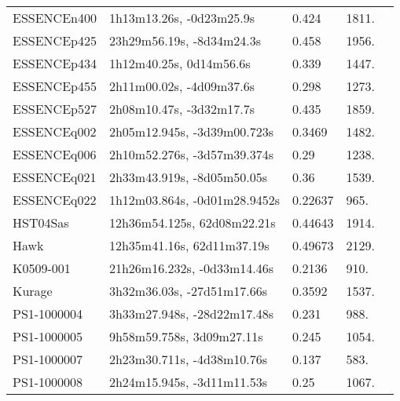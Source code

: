 \begin{longtable}{lllll}
      ESSENCEn400 &       1h13m13.26s, -0d23m25.9s &    0.424 &          1811. &    \citet{2007ApJ...666..674M} \\
      ESSENCEp425 &      23h29m56.19s, -8d34m24.3s &    0.458 &          1956. &    \citet{2007ApJ...666..674M} \\
      ESSENCEp434 &        1h12m40.25s, 0d14m56.6s &    0.339 &          1447. &    \citet{2007ApJ...666..674M} \\
      ESSENCEp455 &       2h11m00.02s, -4d09m37.6s &    0.298 &          1273. &    \citet{2007ApJ...666..674M} \\
      ESSENCEp527 &       2h08m10.47s, -3d32m17.7s &    0.435 &          1859. &    \citet{2007ApJ...666..674M} \\
      ESSENCEq002 &    2h05m12.945s, -3d39m00.723s &   0.3469 &          1482. &    \citet{2016ApJS..224....3N} \\
      ESSENCEq006 &    2h10m52.276s, -3d57m39.374s &     0.29 &          1238. &    \citet{2016ApJS..224....3N} \\
      ESSENCEq021 &     2h33m43.919s, -8d05m50.05s &     0.36 &          1539. &    \citet{2016ApJS..224....3N} \\
      ESSENCEq022 &   1h12m03.864s, -0d01m28.9452s &  0.22637 &           965. &    \citet{2016SDSSD.C...0000:} \\
         HST04Sas &    12h36m54.125s, 62d08m22.21s &  0.44643 &          1914. &    \citet{2004AJ....127.3121W} \\
             Hawk &     12h35m41.16s, 62d11m37.19s &  0.49673 &          2129. &    \citet{2004AJ....127.3121W} \\
        K0509-001 &    21h26m16.232s, -0d33m14.46s &   0.2136 &           910. &    \citet{2011ApJ...738..162S} \\
           Kurage &     3h32m36.03s, -27d51m17.66s &   0.3592 &          1537. &  \citet{2004AandA...428.1043L} \\
      PS1-1000004 &    3h33m27.948s, -28d22m17.48s &    0.231 &           988. &    \citet{2014ApJ...795...44R} \\
      PS1-1000005 &      9h58m59.758s, 3d09m27.11s &    0.245 &          1054. &    \citet{2014ApJ...795...44R} \\
      PS1-1000007 &     2h23m30.711s, -4d38m10.76s &    0.137 &           583. &    \citet{2014ApJ...795...44R} \\
      PS1-1000008 &     2h24m15.945s, -3d11m11.53s &     0.25 &          1067. &    \citet{2014ApJ...795...44R} \\

\end{longtable}
